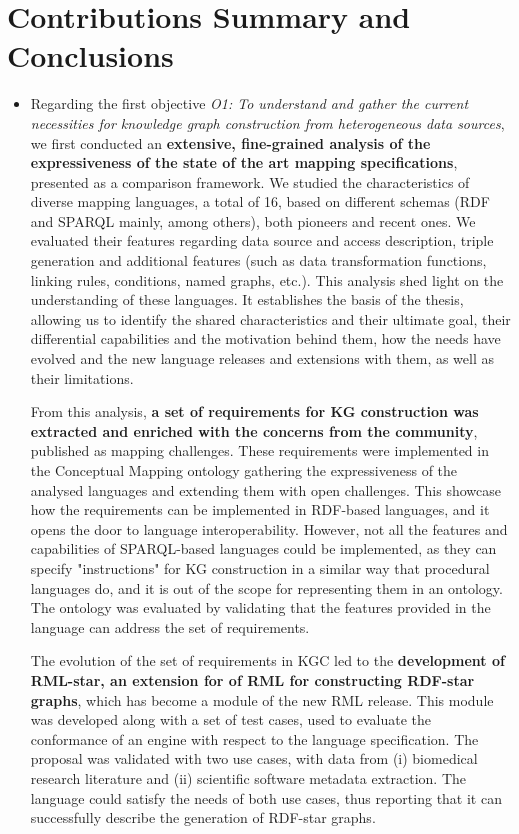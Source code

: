 \section{Contributions Summary and Conclusions}
\label{sec:chp7_summary}
\begin{itemize}
    \item Regarding the first objective \textit{O1: To understand and gather the current necessities for knowledge graph construction from heterogeneous data sources}, we first conducted an \textbf{extensive, fine-grained analysis of the expressiveness of the state of the art mapping specifications}, presented as a comparison framework. 
    We studied the characteristics of diverse mapping languages, a total of 16, based on different schemas (RDF and SPARQL mainly, among others), both pioneers and recent ones. 
    We evaluated their features regarding data source and access description, triple generation and additional features (such as data transformation functions, linking rules, conditions, named graphs, etc.). 
    This analysis shed light on the understanding of these languages. It establishes the basis of the thesis, allowing us to identify the shared characteristics and their ultimate goal, their differential capabilities and the motivation behind them, how the needs have evolved and the new language releases and extensions with them, as well as their limitations.
    
    From this analysis, \textbf{a set of requirements for KG construction was extracted and enriched with the concerns from the community}, published as mapping challenges. 
    These requirements were implemented in the Conceptual Mapping ontology gathering the expressiveness of the analysed languages and extending them with open challenges. This showcase how the requirements can be implemented in RDF-based languages, and it opens the door to language interoperability. 
    However, not all the features and capabilities of SPARQL-based languages could be implemented, as they can specify "instructions" for KG construction in a similar way that procedural languages do, and it is out of the scope for representing them in an ontology. 
    The ontology was evaluated by validating that the features provided in the language can address the set of requirements. 
    
    The evolution of the set of requirements in KGC led to the \textbf{development of RML-star, an extension for of RML for constructing RDF-star graphs}, which has become a module of the new RML release. 
    This module was developed along with a set of test cases, used to evaluate the conformance of an engine with respect to the language specification. 
    The proposal was validated with two use cases, with data from (i) biomedical research literature and (ii) scientific software metadata extraction. 
    The language could satisfy the needs of both use cases, thus reporting that it can successfully describe the generation of RDF-star graphs. 
    

\end{itemize}
